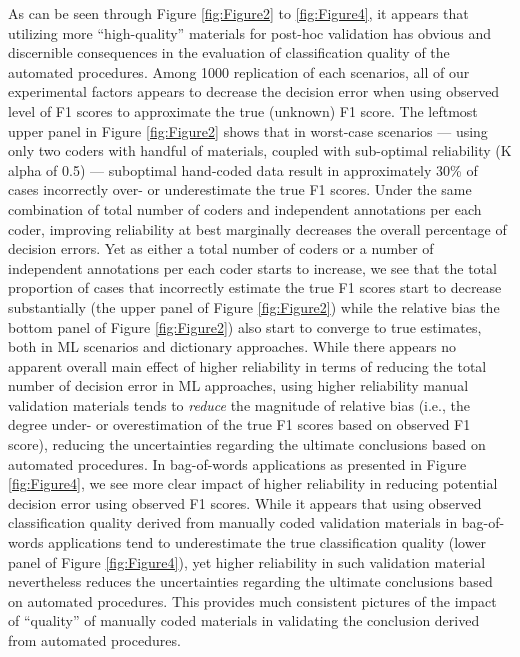 \documentclass[man, 12pt, a4paper, nolmodern, noextraspace]{apa6}
\begin{document}
As can be seen through Figure \ref{fig:Figure2} to \ref{fig:Figure4}, it appears that utilizing more \enquote{high-quality} materials for post-hoc validation has obvious and discernible consequences in the evaluation of classification quality of the automated procedures. Among 1000 replication of each scenarios, all of our experimental factors appears to decrease the decision error when using observed level of F1 scores to approximate the true (unknown) F1 score. The leftmost upper panel in Figure \ref{fig:Figure2} shows that in worst-case scenarios --- using only two coders with handful of materials, coupled with sub-optimal reliability (K alpha of 0.5) --- suboptimal hand-coded data result in approximately 30\% of cases incorrectly over- or underestimate the true F1 scores. Under the same combination of total number of coders and independent annotations per each coder, improving reliability at best marginally decreases the overall percentage of decision errors. Yet as either a total number of coders or a number of independent annotations per each coder starts to increase, we see that the total proportion of cases that incorrectly estimate the true F1 scores start to decrease substantially (the upper panel of Figure \ref{fig:Figure2}) while the relative bias the bottom panel of Figure \ref{fig:Figure2}) also start to converge to true estimates, both in ML scenarios and dictionary approaches. While there appears no apparent overall main effect of higher reliability in terms of reducing the total number of decision error in ML approaches, using higher reliability manual validation materials tends to \textit{reduce} the magnitude of relative bias (i.e., the degree under- or overestimation of the true F1 scores based on observed F1 score), reducing the uncertainties regarding the ultimate conclusions based on automated procedures. In bag-of-words applications as presented in Figure \ref{fig:Figure4}, we see more clear impact of higher reliability in reducing potential decision error using observed F1 scores. While it appears that using observed classification quality derived from manually coded validation materials in bag-of-words applications tend to underestimate the true classification quality (lower panel of Figure \ref{fig:Figure4}), yet higher reliability in such validation material nevertheless reduces the uncertainties regarding the ultimate conclusions based on automated procedures. This provides much consistent pictures of the impact of \enquote{quality} of manually coded materials in validating the conclusion derived from automated procedures.   
\end{document}

